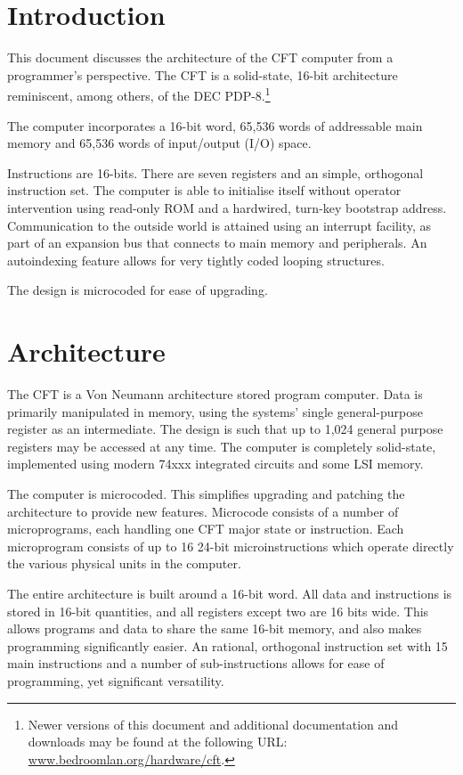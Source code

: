 \documentclass[11pt,a4paper,twocolumns]{article}
\newcommand\link[1]{\sf\href{http://#1}{#1}}
\begin{document}
\section{Introduction}

  This document discusses the architecture of the CFT computer from a
  programmer's perspective. The CFT is a solid-state, 16-bit
  architecture reminiscent, among others, of the DEC
  PDP-8.\footnote{Newer versions of this document and additional
    documentation and downloads may be found at the following URL:\\
    \link{www.bedroomlan.org/hardware/cft}.}

  The computer incorporates a 16-bit word, 65,536 words of addressable
  main memory and 65,536 words of input/output (I/O) space.

  Instructions are 16-bits. There are seven registers and an simple,
  orthogonal instruction set. The computer is able to initialise
  itself without operator intervention using read-only ROM and a
  hardwired, turn-key bootstrap address. Communication to the outside
  world is attained using an interrupt facility, as part of an
  expansion bus that connects to main memory and peripherals. An
  autoindexing feature allows for very tightly coded looping
  structures.

  The design is microcoded for ease of upgrading.

\section{Architecture}

The CFT is a Von Neumann architecture stored program computer. Data is
primarily manipulated in memory, using the systems' single
general-purpose register as an intermediate. The design is such that
up to 1,024 general purpose registers may be accessed at any time. The
computer is completely solid-state, implemented using modern 74xxx
integrated circuits and some LSI memory.

The computer is microcoded. This simplifies upgrading and patching the
architecture to provide new features. Microcode consists of a number
of microprograms, each handling one CFT major state or
instruction. Each microprogram consists of up to 16 24-bit
microinstructions which operate directly the various physical units in
the computer.

The entire architecture is built around a 16-bit word. All data and
instructions is stored in 16-bit quantities, and all registers except
two are 16 bits wide. This allows programs and data to share the same
16-bit memory, and also makes programming significantly easier. An
rational, orthogonal instruction set with 15 main instructions and a
number of sub-instructions allows for ease of programming, yet
significant versatility.
\end{document}
